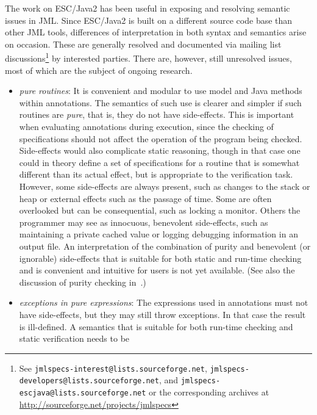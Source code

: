 \documentclass{sig-alternate}
\begin{document}
The work on ESC/Java2 has been useful in exposing and resolving
semantic issues in JML.  Since ESC/Java2 is built on a different
source code base than other JML tools, differences of interpretation
in both syntax and semantics arise on occasion.  These are generally
resolved and documented via mailing list discussions\footnote{See \texttt{jmlspecs-interest@lists.sourceforge.net}, 
\texttt{jmlspecs-developers@lists.sourceforge.net}, and
\texttt{jmlspecs-escjava@lists.sourceforge.net} or the corresponding archives at \url{http://sourceforge.net/projects/jmlspecs}}
by interested
parties.  There are, however, still unresolved issues, most of which
are the subject of ongoing research.
\setlength{\partopsep}{0in}\setlength{\parskip}{0in}\setlength{\itemsep}{0in}\setlength{\topsep}{0in}
\begin{itemize}
\setlength{\partopsep}{0in}\setlength{\parskip}{0in}\setlength{\itemsep}{0in}\setlength{\topsep}{0in}
\item \textit{pure routines}:  It is convenient and modular to use model and Java methods within
annotations.  The semantics of such use is clearer and simpler if such routines are {\em pure}, that is, they do not have side-effects.  This is important when evaluating annotations during
execution, since the checking of specifications should not affect the operation of the program being
checked.  Side-effects would also complicate static reasoning, though in that case one could 
in theory define a set of specifications for a routine that is somewhat different than its actual effect, but is
appropriate to the verification task.   However, some side-effects are
always present, such as changes to the stack or heap or external effects such as the passage of time.  Some are often overlooked but can be consequential, such as locking a monitor. 
 Others the programmer may
see as innocuous, benevolent side-effects, such as maintaining a private cached value or logging debugging information in an output file.
An interpretation of the combination of purity and benevolent (or ignorable)
  side-effects that is suitable for both static and run-time checking and is convenient and intuitive
for users is not yet available. (See also the discussion of purity checking in~\cite{Leavens-etal03a}.)
\item \textit{exceptions in pure expressions}:  The expressions used in annotations must not have
side-effects, but they may still throw exceptions.  In that case the result is ill-defined.  A
semantics that is suitable for both run-time checking and static verification needs to be 

\end{itemize}
\end{document}
